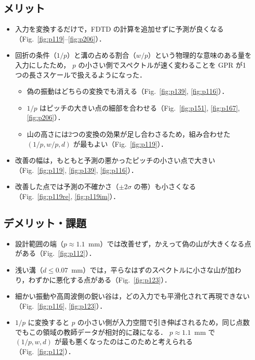 \documentclass{jarticle}
\begin{document}
\subsection*{メリット}
\begin{itemize}
 \item 入力を変換するだけで，FDTD の計算を追加せずに予測が良くなる（Fig.~\ref{fig:p119}--\ref{fig:p206}）．
 \item 回折の条件（$1/p$）と溝の占める割合（$w/p$）という物理的な意味のある量を入力にしたため，
       $p$ の小さい側でスペクトルが速く変わることを GPR が1つの長さスケールで扱えるようになった．
       \begin{itemize}
        \item 偽の振動はどちらの変換でも消える（Fig.~\ref{fig:p139}, \ref{fig:p116}）．
        \item $1/p$ はピッチの大きい点の細部を合わせる（Fig.~\ref{fig:p151}, \ref{fig:p167}, \ref{fig:p206}）．
        \item 山の高さには2つの変換の効果が足し合わさるため，組み合わせた $(1/p, w/p, d)$ が最もよい（Fig.~\ref{fig:p119}）．
       \end{itemize}
 \item 改善の幅は，もともと予測の悪かったピッチの小さい点で大きい（Fig.~\ref{fig:p119}, \ref{fig:p139}, \ref{fig:p116}）．
 \item 改善した点では予測の不確かさ（$\pm 2\sigma$ の帯）も小さくなる（Fig.~\ref{fig:p119re}, \ref{fig:p119im}）．
\end{itemize}

\subsection*{デメリット・課題}
\begin{itemize}
 \item 設計範囲の端（$p \approx 1.1$~mm）では改善せず，かえって偽の山が大きくなる点がある（Fig.~\ref{fig:p112}）．
 \item 浅い溝（$d \le 0.07$~mm）では，平らなはずのスペクトルに小さな山が加わり，わずかに悪化する点がある（Fig.~\ref{fig:p123}）．
 \item 細かい振動や高周波側の鋭い谷は，どの入力でも平滑化されて再現できない（Fig.~\ref{fig:p116}, \ref{fig:p123}）．
 \item $1/p$ に変換すると $p$ の小さい側が入力空間で引き伸ばされるため，同じ点数でもこの領域の教師データが相対的に疎になる．
       $p \approx 1.1$~mm で $(1/p, w, d)$ が最も悪くなったのはこのためと考えられる（Fig.~\ref{fig:p112}）．
\end{itemize}
\end{document}
